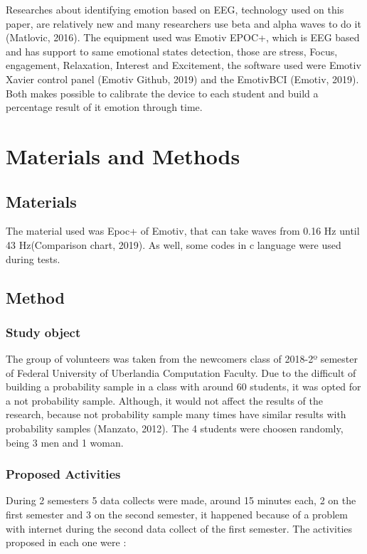 \documentclass[12pt,openright,a4paper]{article}
\begin{document}
Researches about identifying emotion based on EEG, technology used on this paper, are relatively  new and many researchers use beta and alpha waves to do it (Matlovic, 2016). The equipment used was Emotiv EPOC+,  which is EEG based and has support to same emotional states detection, those are stress, Focus, engagement, Relaxation, Interest and Excitement, the software used were Emotiv Xavier control panel (Emotiv Github, 2019) and the EmotivBCI (Emotiv, 2019). Both makes possible to calibrate the device to each student and build a percentage result of it emotion through time.
\section{Materials and Methods}

\subsection{Materials}

The material used was Epoc+ of Emotiv, that can take waves from 0.16 Hz until 43 Hz(Comparison chart, 2019). As well, some codes in c language were used during tests.

\subsection{Method}
 \subsubsection{Study object}
 The group of volunteers was taken from the newcomers class of 2018-2º semester of Federal University of Uberlandia Computation Faculty.  Due to the difficult of building a probability sample in a class with around 60 students, it was opted for a not probability sample. Although, it would not affect the results of the research, because not probability sample many times have similar results with probability samples (Manzato, 2012). The 4 students were choosen randomly, being 3 men and 1 woman.
 \subsubsection{Proposed Activities}
 During 2 semesters 5 data collects were made, around 15 minutes each, 2 on the first semester and 3  on the second semester, it happened because of a problem with internet during the second data collect of the first semester. The activities proposed in each one were :
 
\end{document}

